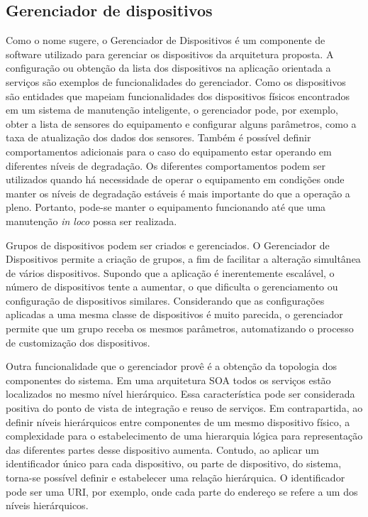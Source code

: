 \subsection{Gerenciador de dispositivos}

Como o nome sugere, o Gerenciador de Dispositivos é um componente de software utilizado para
gerenciar os dispositivos da arquitetura proposta. A configuração ou obtenção da lista dos
dispositivos na aplicação orientada a serviços são exemplos de funcionalidades do gerenciador. Como
os dispositivos são entidades que mapeiam funcionalidades dos dispositivos físicos encontrados em um
sistema de manutenção inteligente, o gerenciador pode, por exemplo, obter a lista de sensores do
equipamento e configurar alguns parâmetros, como a taxa de atualização dos dados dos sensores.
Também é possível definir comportamentos adicionais para o caso do equipamento estar operando em
diferentes níveis de degradação. Os diferentes comportamentos podem ser utilizados quando há
necessidade de operar o equipamento em condições onde manter os níveis de degradação estáveis é mais
importante do que a operação a pleno. Portanto, pode-se manter o equipamento funcionando até que uma
manutenção \textit{in loco} possa ser realizada.

Grupos de dispositivos podem ser criados e gerenciados. O Gerenciador de Dispositivos permite a
criação de grupos, a fim de facilitar a alteração simultânea de vários dispositivos. Supondo que a
aplicação é inerentemente escalável, o número de dispositivos tente a aumentar, o que dificulta o
gerenciamento ou configuração de dispositivos similares. Considerando que as configurações aplicadas
a uma mesma classe de dispositivos é muito parecida, o gerenciador permite que um grupo receba os
mesmos parâmetros, automatizando o processo de customização dos dispositivos.

Outra funcionalidade que o gerenciador provê é a obtenção da topologia dos componentes do sistema.
Em uma arquitetura \gls{SOA} todos os serviços estão localizados no mesmo nível hierárquico. Essa
característica pode ser considerada positiva do ponto de vista de integração e reuso de serviços. Em
contrapartida, ao definir níveis hierárquicos entre componentes de um mesmo dispositivo físico, a
complexidade para o estabelecimento de uma hierarquia lógica para representação das diferentes
partes desse dispositivo aumenta. Contudo, ao aplicar um identificador único para cada dispositivo,
ou parte de dispositivo, do sistema, torna-se possível definir e estabelecer uma relação
hierárquica. O identificador pode ser uma \gls{URI}, por exemplo, onde cada parte do endereço se
refere a um dos níveis hierárquicos.

